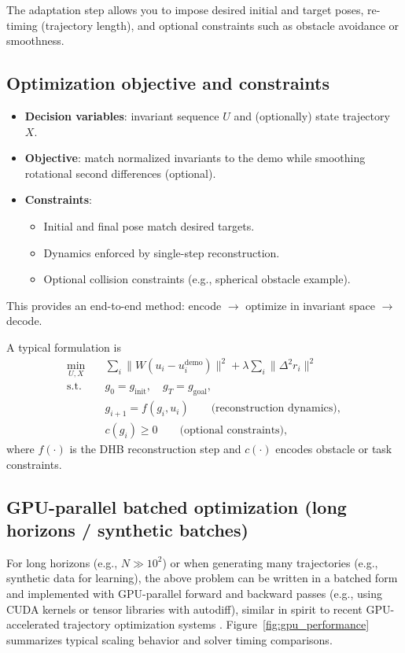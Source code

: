 \documentclass[11pt]{article}
\begin{document}
The adaptation step allows you to impose desired initial and target poses, re-timing (trajectory length), and optional constraints such as obstacle avoidance or smoothness.

\subsection{Optimization objective and constraints}
\begin{itemize}
  \item \textbf{Decision variables}: invariant sequence $U$ and (optionally) state trajectory $X$.
  \item \textbf{Objective}: match normalized invariants to the demo while smoothing rotational second differences (optional).
  \item \textbf{Constraints}:
    \begin{itemize}
      \item Initial and final pose match desired targets.
      \item Dynamics enforced by single-step reconstruction.
      \item Optional collision constraints (e.g., spherical obstacle example).
    \end{itemize}
\end{itemize}

This provides an end-to-end method: encode $\to$ optimize in invariant space $\to$ decode.

A typical formulation is
\begin{align}
  \min_{U,X}\quad & \sum_i \lVert W (u_i - u_i^{\mathrm{demo}})\rVert^2 + \lambda \sum_i \lVert \Delta^2 r_i\rVert^2 \\
  \text{s.t.}\quad & g_0 = g_{\mathrm{init}},\quad g_T = g_{\mathrm{goal}}, \\
  & g_{i+1} = f(g_i, u_i) \qquad \text{(reconstruction dynamics)}, \\
  & c(g_i) \ge 0 \qquad \text{(optional constraints)},
\end{align}
where $f(\cdot)$ is the DHB reconstruction step and $c(\cdot)$ encodes obstacle or task constraints.

\subsection{GPU-parallel batched optimization (long horizons / synthetic batches)}
For long horizons (e.g., $N\gg 10^2$) or when generating many trajectories (e.g., synthetic data for learning), the above problem can be written in a batched form and implemented with GPU-parallel forward and backward passes (e.g., using CUDA kernels or tensor libraries with autodiff), similar in spirit to recent GPU-accelerated trajectory optimization systems \cite{neunert2018gpu,adahjania2022multirobot,suh2023curobo,du2025gato,shi2025top}. Figure~\ref{fig:gpu_performance} summarizes typical scaling behavior and solver timing comparisons.
\end{document}
